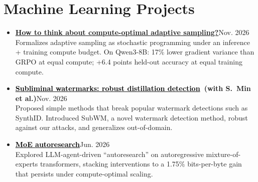 \documentclass[11pt]{article}
\newcommand{\entry}[2]{\textbf{#1}\hfill{\small #2}}
\begin{document}
\section{Machine Learning Projects}
\begin{itemize}
  \item \entry{\href{https://chang-han-chen.github.io/science-adaptive-sampling/}{\textcolor{hl}{How to think about compute-optimal adaptive sampling?}}}{Nov. 2026}\\
        Formalizes adaptive sampling as stochastic programming under an inference + training compute budget.
        On Qwen3-8B: 17\% lower gradient variance than GRPO at equal compute; +6.4 points held-out accuracy
        at equal training compute.
  \item \entry{\href{https://subliminal-watermarks.github.io}{\textcolor{black}{Subliminal watermarks: robust distillation detection}}\ \normalfont(with S.\ Min et al.)}{Nov. 2026}\\
        Proposed simple methods that break popular watermark detections such as SynthID. Introduced SubWM,
        a novel watermark detection method, robust against our attacks, and generalizes out-of-domain.
  \item \entry{\href{https://github.com/Chang-Han-Chen/autoresearch-moe}{\textcolor{black}{MoE autoresearch}}}{Jun. 2026}\\
        Explored LLM-agent-driven ``autoresearch'' on autoregressive mixture-of-experts transformers,
        stacking interventions to a 1.75\% bits-per-byte gain that persists under compute-optimal scaling.
\end{itemize}

\end{document}
